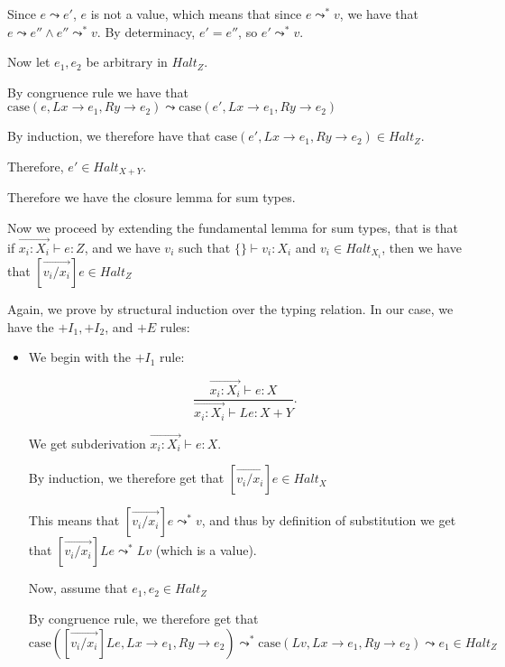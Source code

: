 \begin{enumerate}
\begin{itemize}
        Since $e \leadsto e'$, $e$ is not a value, which means that since $e \leadsto^* v$, we have that $e \leadsto e'' \wedge e'' \leadsto^* v$. By determinacy, $e' = e''$, so $e' \leadsto^* v$.

        Now let $e_1, e_2$ be arbitrary in $Halt_Z$.

        By congruence rule we have that $\text{case}(e, L x \rightarrow e_1, R y \rightarrow e_2) \leadsto \text{case}(e', L x \rightarrow e_1, R y \rightarrow e_2)$

        By induction, we therefore have that $\text{case}(e', L x \rightarrow e_1, R y \rightarrow e_2) \in Halt_Z$.

        Therefore, $e' \in Halt_{X + Y}$.
    \end{itemize}

    Therefore we have the closure lemma for sum types.

    Now we proceed by extending the fundamental lemma for sum types, that is that if $\overrightarrow{x_i : X_i} \vdash e : Z$, and we have $v_i$ such that $\{\} \vdash v_i : X_i$ and $v_i \in Halt_{X_i}$, then we have that $[\overrightarrow{v_i / x_i}]e \in Halt_Z$

    Again, we prove by structural induction over the typing relation. In our case, we have the $+I_1, +I_2$, and $+E$ rules:

    \begin{itemize}
      \item
        We begin with the $+I_1$ rule:

        \[
          \frac{\overrightarrow{x_i : X_i} \vdash e : X}{\overrightarrow{x_i : X_i} \vdash L e : X + Y}
        .\] 

        We get subderivation $\overrightarrow{x_i : X_i} \vdash e : X$.

        By induction, we therefore get that $[\overrightarrow{v_i / x_i}] e \in Halt_X$

        This means that $[\overrightarrow{v_i / x_i}] e \leadsto^* v$, and thus by definition of substitution we get that $[\overrightarrow{v_i / x_i}]L e \leadsto^* L v$ (which is a value).

        Now, assume that $e_1, e_2 \in Halt_Z$

        By congruence rule, we therefore get that $\text{case}([\overrightarrow{v_i / x_i}]L e, L x \rightarrow e_1, R y \rightarrow e_2) \leadsto^* \text{case}(L v, L x \rightarrow e_1, R y \rightarrow e_2) \leadsto e_1 \in Halt_Z$


\end{itemize}
\end{enumerate}
